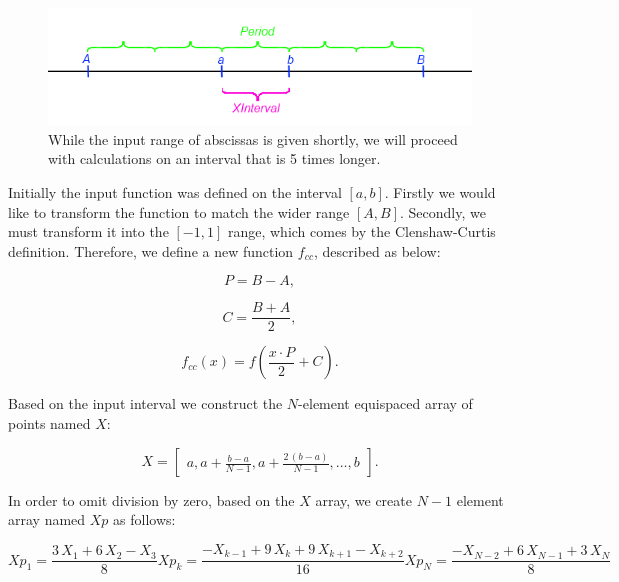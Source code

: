 \documentclass[12pt,twoside,a4paper]{article}
\numberwithin{equation}{subsection}
\numberwithin{figure}{subsection}
\begin{document}
\begin{figure} 
  \includegraphics[width=150mm]{img/cci_bigger_interval.png}
  \caption{While the input range of abscissas is given shortly, we will proceed with calculations on an interval that is 5 times longer. \label{fig:cci_bigger_interval}
  }
\end{figure}

Initially the input function was defined on the interval $[a, b]$. Firstly we would like to transform the function to match the wider range $[A, B]$. Secondly, we must transform it into the $[-1, 1]$ range, which comes by the Clenshaw-Curtis definition. Therefore, we define a new function $f_{cc}$, described as below:

\begin{equation} \label{eq:cci_period}
	P = B - A,
\end{equation}

\begin{equation} \label{eq:cci_center}
	C = \frac{B + A}{2},
\end{equation}

\begin{equation} \label{eq:cci_cecfun}
	f_{cc}(x) = f \left( \frac{x \cdot P}{2} + C\right).
\end{equation}



Based on the input interval we construct the $N$-element equispaced array of points named $X$:

\begin{equation}
	X = \begin{bmatrix}
			a, a + \frac{b-a}{N-1}, a + \frac{2 \, (b - a)}{N-1}, \ldots, b
		\end{bmatrix}.
\end{equation}

In order to omit division by zero, based on the $X$ array, we create $N-1$ element array named $Xp$ as follows:

\begin{subequations} \label{eq:cci_cubicinterpolation}
  \begin{equation}   \label{eq:ccicinterp_first}
    Xp_1 = \frac {3 \, X_1 + 6 \, X_2 - X_3}{8}
  \end{equation}
  \begin{equation}   \label{eq:ccicinterp_next}
    Xp_k = \frac { - X_{k - 1} + 9 \, X_k + 9 \, X_{k + 1} - X_{k + 2}}{16}
  \end{equation}
  \begin{equation}   \label{eq:ccicinterp_last}
    Xp_N = \frac { - X_{N - 2} + 6 \, X_{N - 1} + 3 \, X_N}{8}
  \end{equation}
\end{subequations}
\end{document}
